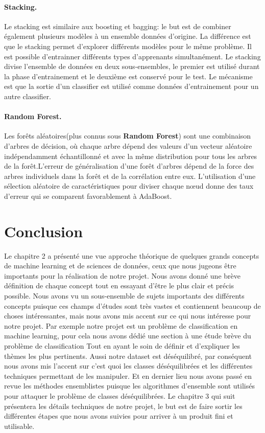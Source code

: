 \documentclass[12pt, french]{report}
\begin{document}
\paragraph{Stacking.}
Le stacking est similaire aux boosting et bagging: le but est de combiner également plusieurs modèles à un ensemble données d'origine. La différence est que le stacking permet d'explorer différents modèles pour le même problème. Il est possible d'entrainner différents types d'apprenants simultanément. Le stacking divise l'ensemble de données en deux sous-ensembles, le premier est utilisé durant la phase d'entrainement et le deuxième est conservé pour le test. Le mécanisme est que la sortie d'un classifier est utilisé comme données d'entrainement pour un autre classifier.  
\paragraph{Random Forest.}
Les forêts aléatoires(plus connus sous \textbf{Random Forest}) sont une combinaison d'arbres  de  décision,  où  chaque  arbre  dépend  des  valeurs  d'un  vecteur  aléatoire indépendamment échantillonné et avec la même distribution pour tous les arbres de la forêt.L'erreur  de  généralisation  d'une  forêt  d'arbres  dépend  de  la  force  des  arbres individuels  dans  la  forêt  et  de  la  corrélation  entre  eux.  L'utilisation d'une  sélection aléatoire  de  caractéristiques  pour  diviser  chaque nœud donne des  taux  d'erreur  qui se comparent favorablement à AdaBoost. \cite{key1}\\

\section{Conclusion}
Le chapitre 2 a présenté une vue approche théorique de quelques grands concepts de machine learning et de sciences de données, ceux que nous jugeons être importants pour la réalisation de notre projet. Nous avons donné une brève définition de chaque concept tout en essayant d'être le plus clair et précis possible. Nous avons vu un sous-ensemble de sujets importants des différents concepts puisque ces champs d'études sont très vastes et contiennent beaucoup de choses intéressantes, mais nous avons mis accent sur ce qui nous intéresse pour notre projet. Par exemple notre projet est un problème de classification en machine learning, pour cela nous avons dédié une section à une étude brève du problème de classification Tout en ayant le soin de définir et d'expliquer les thèmes les plus pertinents. Aussi notre dataset est déséquilibré, par conséquent nous avons mis l'accent sur c'est quoi les classes déséquilibrées et les différentes techniques permettant de les manipuler. Et en dernier lieu nous avons passé en revue les méthodes ensemblistes puisque les algorithmes d'ensemble sont utilisés pour attaquer le problème de classes déséquilibrées. Le chapitre 3 qui suit présentera les détails techniques de notre projet, le but est de faire sortir les différentes étapes que nous avons suivies pour arriver à un produit fini et utilisable.
\end{document}
